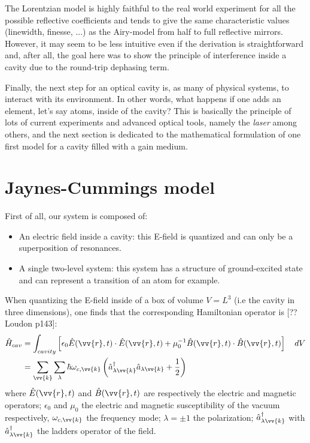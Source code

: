 \documentclass[11pt]{report}
\begin{document}
The Lorentzian model is highly faithful to the real world experiment for all the possible reflective coefficients and tends to give the same characteristic values (linewidth, finesse, ...) as the Airy-model from half to full reflective mirrors. However, it may seem to be less intuitive even if the derivation is straightforward and, after all, the goal here was to show the principle of interference inside a cavity due to the round-trip dephasing term.

Finally, the next step for an optical cavity is, as many of physical systems, to interact with its environment. In other words, what happens if one adds an element, let's say atoms, inside of the cavity? This is basically the principle of lots of current experiments and advanced optical tools, namely the \textit{laser} among others, and the next section is dedicated to the mathematical formulation of one first model for a cavity filled with a gain medium.

\section{Jaynes-Cummings model}

First of all, our system is composed of:
\begin{itemize}
	\item An electric field inside a cavity: this E-field is quantized and can only be a superposition of resonances.
	\item A single two-level system: this system has a structure of ground-excited state and can represent a transition of an atom for example.
\end{itemize}

When quantizing the E-field inside of a box of volume $V = L^3$ (i.e the cavity in three dimensions), one finds that the corresponding Hamiltonian operator is [??Loudon p143]:
\begin{align}
\hat{H}_{cav} &= \int_{cavity} \left[\epsilon_0 \hat{E}(\vv{r}, t) \cdot \hat{E}(\vv{r}, t) + \mu_0^{-1} \hat{B}(\vv{r}, t) \cdot \hat{B}(\vv{r}, t)\right] \quad dV\\
&= \sum_{\vv{k}} \sum_{\lambda} \hbar \omega_{c,\vv{k}} \left( \hat{a}_{\lambda \vv{k}}^\dag \hat{a}_{\lambda \vv{k}} + \frac{1}{2} \right)
\end{align}
where $\hat{E}(\vv{r}, t)$ and $\hat{B}(\vv{r}, t)$ are respectively the electric and magnetic operators; $\epsilon_0$ and $\mu_0$ the electric and magnetic susceptibility of the vacuum respectively, $\omega_{c,\vv{k}}$ the frequency mode; $\lambda=\pm 1$ the polarization; $\hat{a}_{\lambda \vv{k}}^\dag$ with $\hat{a}_{\lambda \vv{k}}^\dag$ the ladders operator of the field.
\end{document}
